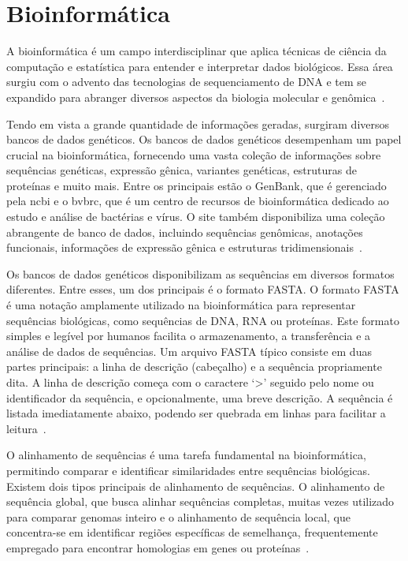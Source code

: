 \section{Bioinformática}
A bioinformática é um campo interdisciplinar que aplica técnicas de ciência da computação e estatística para entender e interpretar dados biológicos. Essa área surgiu com o advento das tecnologias de sequenciamento de DNA e tem se expandido para abranger diversos aspectos da biologia molecular e genômica~\cite{bioinformatica_verli_2014}.

Tendo em vista a grande quantidade de informações geradas, surgiram diversos bancos de dados genéticos. Os bancos de dados genéticos desempenham um papel crucial na bioinformática, fornecendo uma vasta coleção de informações sobre sequências genéticas, expressão gênica, variantes genéticas, estruturas de proteínas e muito mais. Entre os principais estão o GenBank, que é gerenciado pela \gls{ncbi} e o \gls{bvbrc}, que é um centro de recursos de bioinformática dedicado ao estudo e análise de bactérias e vírus. O site também disponibiliza uma coleção abrangente de banco de dados, incluindo sequências genômicas, anotações funcionais, informações de expressão gênica e estruturas tridimensionais~\cite{ncbi, bvbrc}.

Os bancos de dados genéticos disponibilizam as sequências em diversos formatos diferentes. Entre esses, um dos principais é o formato {FASTA}. O formato {FASTA} é uma notação amplamente utilizado na bioinformática para representar sequências biológicas, como sequências de DNA, RNA ou proteínas. Este formato simples e legível por humanos facilita o armazenamento, a transferência e a análise de dados de sequências. Um arquivo {FASTA} típico consiste em duas partes principais: a linha de descrição (cabeçalho) e a sequência propriamente dita. A linha de descrição começa com o caractere `>' seguido pelo nome ou identificador da sequência, e opcionalmente, uma breve descrição. A sequência é listada imediatamente abaixo, podendo ser quebrada em linhas para facilitar a leitura~\cite{fasta_improved_pearson_1988}.

O alinhamento de sequências é uma tarefa fundamental na bioinformática, permitindo comparar e identificar similaridades entre sequências biológicas. Existem dois tipos principais de alinhamento de sequências. O alinhamento de sequência global, que busca alinhar sequências completas, muitas vezes utilizado para comparar genomas inteiro e o alinhamento de sequência local, que concentra-se em identificar regiões específicas de semelhança, frequentemente empregado para encontrar homologias em genes ou proteínas~\cite{similarities_needleman-wunsch_1970,bioinformatics_david_2004}.

